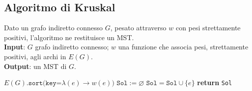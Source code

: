 \documentclass[14pt]{extreport}
\theoremstyle{definition}
\theoremstyle{definition}
\begin{document}
\subsection{Algoritmo di Kruskal}

\begin{algorithm}[H]
    \caption{
        Dato un grafo indiretto connesso $G$, pesato attraverso $w$ con pesi strettamente positivi, l'algoritmo ne restituisce un MST.\\
        \textbf{Input}: $G$ grafo indiretto connesso; $w$ una funzione che associa pesi, strettamente positivi, agli archi in $E(G)$.\\
        \textbf{Output}: un MST di $G$.
    }

    \begin{algorithmic}[1]
            \State $E(G)\texttt{.sort(key=}\lambda (e) \rightarrow w(e)\texttt{)}$ 
            \State $\texttt{Sol}:= \varnothing$
             
                    \State $\texttt{Sol} = \texttt{Sol} \cup \{e\}$
                \EndIf
            \EndFor
            \State \textbf{return} \texttt{Sol}
        \EndFunction
    \end{algorithmic}
\end{algorithm}
\end{document}

